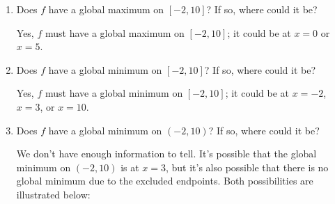 \documentclass{article}
\begin{document}
\begin{enumerate}
\begin{enumerate}
  \item
    \begin{problem}[\vfill]
      Does $f$ have a global maximum on $[-2, 10]$? If so, where could it be?
    \end{problem}

    \begin{solution}
      Yes, $f$ must have a global maximum on $[-2, 10]$; it could be at $x = 0$ or $x = 5$.
    \end{solution}

  \item
    \begin{problem}[\vfill]
      Does $f$ have a global minimum on $[-2, 10]$? If so, where could it be?
    \end{problem}

    \begin{solution}
      Yes, $f$ must have a global minimum on $[-2, 10]$; it could be at $x = -2$, $x = 3$, or $x = 10$.
    \end{solution}

  \item
    \begin{problem}[\vfill\newpage]
      Does $f$ have a global minimum on $(-2, 10)$? If so, where could it be? 
    \end{problem}

    \begin{solution}
      We don't have enough information to tell. It's possible that the global minimum
      on $(-2, 10)$ is at $x=3$, but it's also possible that there is no global minimum
      due to the excluded endpoints. Both possibilities are illustrated below:
      \begin{center}
        \hspace{0.5in}
      \end{center}
    \end{solution}


\end{enumerate}
\end{enumerate}
\end{document}
